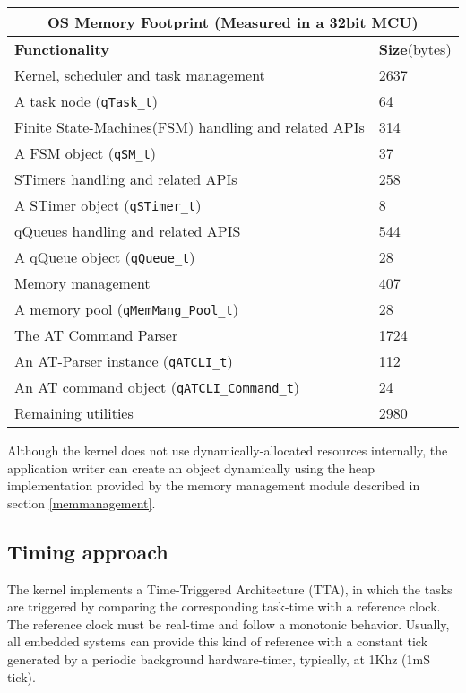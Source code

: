\begin{tabular}{ |p{10cm}||p{1.5cm}|  }
 \hline
 \multicolumn{2}{|c|}{ \textbf{OS Memory Footprint} \scriptsize{(Measured in a 32bit MCU)}} \\
 \hline
 \textbf{Functionality} & \textbf{Size}\scriptsize{(bytes)}\\
 \hline
 Kernel, scheduler and task management& 2637\\
 A task node ({\lstinline!qTask_t!}) & 64\\
 Finite State-Machines(FSM) handling and related APIs& 314\\
 A FSM object ({\lstinline!qSM_t!}) & 37 \\
 STimers handling and related APIs & 258\\
 A STimer object ({\lstinline!qSTimer_t!})& 8\\
 qQueues handling and related APIS & 544\\
 A qQueue object ({\lstinline!qQueue_t!}) & 28\\
 Memory management & 407\\
 A memory pool ({\lstinline!qMemMang_Pool_t!}) & 28 \\ 
 The AT Command Parser & 1724\\
 An AT-Parser instance ({\lstinline!qATCLI_t!})& 112\\
 An AT command object ({\lstinline!qATCLI_Command_t!})& 24\\
 Remaining utilities& 2980\\
 \hline
\end{tabular}

 \begin{tcolorbox}
 \HandRight Although the kernel does not use dynamically-allocated resources internally, the application writer can create an object dynamically using the heap implementation provided by the memory management module described in section \ref{memmanagement}.
 \end{tcolorbox}

\subsection{Timing approach}
The kernel implements a Time-Triggered Architecture (TTA)\cite{pont}, in which the tasks are triggered by comparing the corresponding task-time with a reference clock. The reference clock must be real-time and follow a monotonic behavior. Usually, all embedded systems can provide this kind of reference with a constant tick generated by a periodic background hardware-timer, typically, at 1Khz (1mS tick). 

